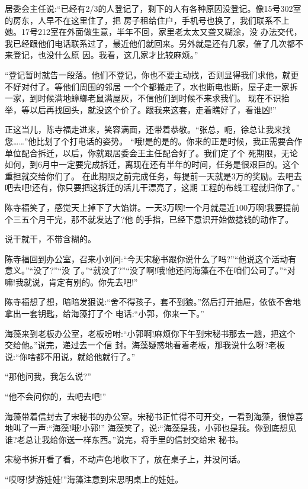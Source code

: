 \documentclass[11pt,a4paper,onecolumn]{article}
\begin{document}
居委会主任说:``已经有2/3的人登记了，剩下的人有各种原因没登记。像15号302室的房东，人早不在这里住了，把
房子租给住户，手机号也换了，我们联系不上她。17号212室在外面做生意，半年不回，家里老太太又聋又糊涂，没
办法交代，我已经跟他们电话联系过了，最近他们就回来。另外就是还有几家，催了几次都不来登记，也没什么原
因。我看，这几家才比较麻烦。''

``登记暂时就告一段落。他们不登记，你也不要主动找，否则显得我们求他，就更不好对付了。等他们周围的邻居
一个个都搬走了，水也断电也断，屋子走一家拆一家，到时候满地蟑螂老鼠满屋灰，不信他们到时候不来求我们。
现在不识抬举，等以后再找回头，就没这个价了。跟我来这套，走着瞧好了，看谁凶!''

正这当儿，陈寺福走进来，笑容满面，还带着恭敬。``张总，呃，徐总让我来找您……''他比划了个打电话的姿势。
``哦!是的是的。你来的正是时候，我正需要合作单位配合拆迁，以后，你就跟居委会王主任配合好了。我们定了个
死期限，无论如何，到6月中一定要完成拆迁，离现在还有半年的时间，任务是很艰巨的。这个重担就交给你们了。
在此期限之前完成任务，每提前一天就是3万的奖励。去吧去吧去吧!还有，你只要把这拆迁的活儿干漂亮了，这期
工程的布线工程就归你了。''

陈寺福笑了，感觉天上掉下了大馅饼。一天3万啊!一个月就是近100万啊!我要提前个三五个月干完，那不就发达了?他
的手指，已经下意识开始做捻钱的动作了。

说干就干，不带含糊的。

陈寺福回到办公室，召来小刘问:``今天宋秘书跟你说什么了吗?''``他说这个活动有意义。''``没了?''``没
了。''``就没了?''``没了啊!哦!他还问海藻在不在咱们公司了。''``对嘛!我就说，肯定有别的。你先去吧!''

陈寺福想了想，暗暗发狠说:``舍不得孩子，套不到狼。''然后打开抽屉，依依不舍地拿出一套钥匙，给海藻打了个
电话:``小郭，你来一下。''

海藻来到老板办公室，老板吩咐:``小郭啊!麻烦你下午到宋秘书那去一趟，把这个交给他。''说完，递过去一个信
封。海藻疑惑地看着老板，那我说什么呀?老板说:``你啥都不用说，就给他就行了。''

``那他问我，我怎么说?''

``他不会问你的，去吧去吧!''

海藻带着信封去了宋秘书的办公室。宋秘书正忙得不可开交，一看到海藻，很惊喜地叫了一声:``海藻!哦!小郭!''
海藻笑了，说:``海藻是我，小郭也是我。你到底想见谁?老总让我给你送一样东西。''说完，将手里的信封交给宋
秘书。

宋秘书拆开看了看，不动声色地收下了，放在桌子上，并没问话。

``哎呀!梦游娃娃!''海藻注意到宋思明桌上的娃娃。
\end{document}
